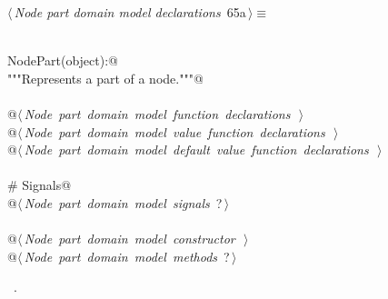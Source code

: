 \documentclass[
    a4paper,      %
    10pt,         %
    openright,    %
    notitlepage,  %
    parskip=half, %
]{scrreprt}       %
\theoremstyle{definition}                    %
\begin{document}
\begin{flushleft} \small
\begin{minipage}{\linewidth}\label{scrap106}\raggedright\small
{} $\langle\,${\itshape Node part domain model declarations}\nobreak\ {\footnotesize {65a}}$\,\rangle\equiv$
\vspace{-1exm}
\begin{list}{}{} \item
\mbox{}\lstinline@@\\
\mbox{}\lstinline@class NodePart(object):@\\
\mbox{}\lstinline@    """Represents a part of a node."""@\\
\mbox{}\lstinline@@\\
\mbox{}\lstinline@    @\hbox{$\langle\,${\itshape Node part domain model function declarations}\nobreak\ {\footnotesize {}}$\,\rangle$}\lstinline@@\\
\mbox{}\lstinline@    @\hbox{$\langle\,${\itshape Node part domain model value function declarations}\nobreak\ {\footnotesize {}}$\,\rangle$}\lstinline@@\\
\mbox{}\lstinline@    @\hbox{$\langle\,${\itshape Node part domain model default value function declarations}\nobreak\ {\footnotesize {}}$\,\rangle$}\lstinline@@\\
\mbox{}\lstinline@@\\
\mbox{}\lstinline@    # Signals@\\
\mbox{}\lstinline@    @\hbox{$\langle\,${\itshape Node part domain model signals}\nobreak\ {\footnotesize ?}$\,\rangle$}\lstinline@@\\
\mbox{}\lstinline@@\\
\mbox{}\lstinline@    @\hbox{$\langle\,${\itshape Node part domain model constructor}\nobreak\ {\footnotesize {}}$\,\rangle$}\lstinline@@\\
\mbox{}\lstinline@    @\hbox{$\langle\,${\itshape Node part domain model methods}\nobreak\ {\footnotesize ?}$\,\rangle$}\lstinline@@\\
\mbox{}\lstinline@@{\NWsep}
\end{list}
\vspace{-1.5ex}
\footnotesize
\begin{list}{}{\setlength{\itemsep}{-\parsep}\setlength{\itemindent}{-\leftmargin}}
\item \NWtxtMacroRefIn\ .

\item{}
\end{list}
\end{minipage}\vspace{4ex}
\end{flushleft}
\end{document}
